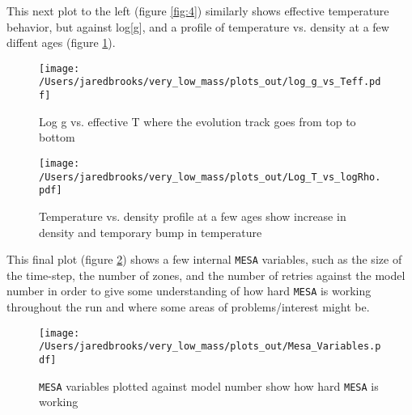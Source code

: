 \documentclass{article}
\begin{document}
        This next plot to the left (figure \ref{fig:4}) similarly shows effective temperature behavior, but against log[g], and a profile of temperature vs. density at a few diffent ages (figure \ref{fig:5}).

        \begin{figure}[H]
                \begin{minipage}{0.5\linewidth}
                       \centering
                       \texttt{[image: /Users/jaredbrooks/very\_low\_mass/plots\_out/log\_g\_vs\_Teff.pdf]}
                       \caption{\footnotesize Log g vs. effective T where the evolution track goes from top to bottom}
                       \label{fig:4}
                       \end{minipage}
                \hspace{0cm}
                \begin{minipage}{0.5\linewidth}
                       \centering
                       \texttt{[image: /Users/jaredbrooks/very\_low\_mass/plots\_out/Log\_T\_vs\_logRho.pdf]}
                       \caption{\footnotesize Temperature vs. density profile at a few ages show increase in density and temporary bump in temperature}
                       \label{fig:5}
                \end{minipage}
        \end{figure}

        \pagebreak

        This final plot (figure \ref{fig:6}) shows a few internal \texttt{MESA} variables, such as the size of the time-step, the number of zones, and the number of retries against the model number in order to give some understanding of how hard \texttt{MESA} is working throughout the run and where some areas of problems/interest might be.

        \begin{figure}[H]
                \centering
                \texttt{[image: /Users/jaredbrooks/very\_low\_mass/plots\_out/Mesa\_Variables.pdf]}
                \caption{\texttt{MESA} variables plotted against model number show how hard \texttt{MESA} is working}
                \label{fig:6}
        \end{figure}
\end{document}

